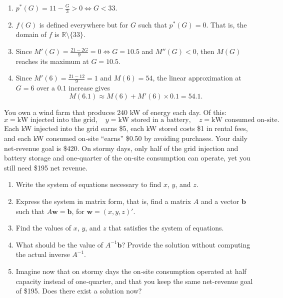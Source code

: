 \documentclass[11pt]{exam}
\newcommand{\R}{\mathbb{R}} %
\begin{document}
\begin{questions}
\begin{solution}
\begin{enumerate}[label=(\alph*)]
   \item $p^*(G) = 11-\tfrac{G}{3}>0 \Longleftrightarrow G<33$.
    
    \item $f(G)$ is defined everywhere but for $G$ such that $p^*(G) = 0$. That is, the domain of $f$ is $\R\setminus\{33\}$.
    
    
    \item Since $M'(G)=\frac{21-2G}{9} = 0 \Longleftrightarrow G = 10.5$ and $M''(G) < 0$, then $M(G)$ reaches its maximum at $G = 10.5$.
    
    \item Since $M'(6)=\frac{21-12}{9}=1$ and $M(6) = 54$, the linear approximation at \(G=6\) over a \(0.1\) increase gives
    \[
      M(6.1)\approx M(6)+M'(6)\times 0.1 = 54.1.
    \]
\end{enumerate}
\end{solution}

\question[2.5]
You own a wind farm that produces \(240\) kW of energy each day. Of this:
\[
x = \text{kW injected into the grid},\quad
y = \text{kW stored in a battery},\quad
z = \text{kW consumed on‑site}.
\]
Each kW injected into the grid earns \$5, each kW stored costs \$1 in rental fees, and each kW consumed on‑site “earns” \$0.50 by avoiding purchases.  Your daily net‑revenue goal is \$420.  On stormy days, only half of the grid injection and battery storage and one‑quarter of the on‑site consumption can operate, yet you still need \$195 net revenue.
\begin{enumerate}[leftmargin=0.5cm,label=(\alph*)]
  \item Write the system of equations necessary to find $x$, $y$, and $z$.
  \item Express the system in matrix form, that is, find a matrix $A$ and a vector $\pmb{b}$ such that $A\pmb{w} = \pmb{b}$, for $\pmb{w} = (x, y, z)'$.
  \item Find the values of $x$, $y$, and $z$ that satisfies the system of equations.
  \item What should be the value of $A^{-1}\pmb{b}$? Provide the solution without computing the actual inverse $A^{-1}$.
  \item Imagine now that on stormy days the on‑site consumption operated at half capacity instead of one‑quarter, and that you keep the same net-revenue goal of \$195. Does there exist a solution now?
\end{enumerate}


\end{questions}
\end{document}

